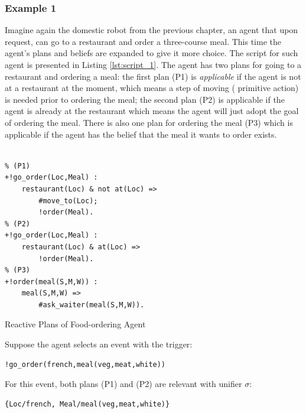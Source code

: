 \subsubsection*{Example 1}
Imagine again the domestic robot from the previous chapter, an agent that upon request, can go to a restaurant and order a three-course meal. This time the agent's plans and beliefs are expanded to give it more choice. The script for such agent is presented in Listing \ref{lst:script_1}.
The agent has two plans for going to a restaurant and ordering a meal: the first plan (P1) is \textit{applicable} if the agent is not at a restaurant at the moment, which means a step of moving ( primitive action) is needed prior to ordering the meal; the second plan (P2) is applicable if the agent is already at the restaurant which means the agent will just adopt the goal of ordering the meal. There is also one plan for ordering the meal (P3) which is applicable if the agent has the belief that the meal it wants to order exists.
\begin{listing}[t]
\centering
\begin{tcolorbox}[left=2pt,right=2pt,top=2pt,bottom=2pt,arc=0pt,
                  boxrule=0pt,toprule=1pt,
                  colback=white]
\begin{verbatim}

% (P1) 
+!go_order(Loc,Meal) :
    restaurant(Loc) & not at(Loc) =>
        #move_to(Loc);
        !order(Meal).
% (P2) 
+!go_order(Loc,Meal) :
    restaurant(Loc) & at(Loc) => 
        !order(Meal). 
% (P3) 
+!order(meal(S,M,W)) : 
    meal(S,M,W) => 
        #ask_waiter(meal(S,M,W)).
\end{verbatim}
    \end{tcolorbox}
    \caption{Reactive Plans of Food-ordering Agent}
    \label{lst:script_1}

\end{listing}%
\noindent Suppose the agent selects an event with the trigger: 
\begin{verbatim}
!go_order(french,meal(veg,meat,white))
\end{verbatim}
For this event, both plans (P1) and (P2) are relevant with unifier $\sigma$:
\begin{verbatim}
{Loc/french, Meal/meal(veg,meat,white)}
\end{verbatim}
